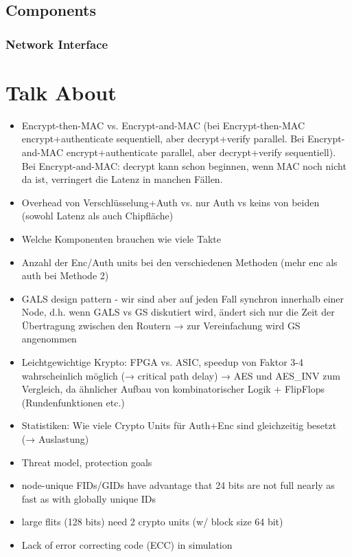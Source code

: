 \documentclass[
	paper=a4,
	fontsize=11pt,
	parskip=full %
]{scrreprt}
\begin{document}
    \section{Components}
    \subsection{Network Interface}

    \chapter{Talk About}
    \begin{itemize}
        \item Encrypt-then-MAC vs. Encrypt-and-MAC (bei Encrypt-then-MAC encrypt+authenticate sequentiell, aber decrypt+verify parallel.
            Bei Encrypt-and-MAC encrypt+authenticate parallel, aber decrypt+verify sequentiell). Bei Encrypt-and-MAC: decrypt kann schon
            beginnen, wenn MAC noch nicht da ist, verringert die Latenz in manchen Fällen.
        \item Overhead von Verschlüsselung+Auth vs. nur Auth vs keins von beiden (sowohl Latenz als auch Chipfläche)
        \item Welche Komponenten brauchen wie viele Takte
        \item Anzahl der Enc/Auth units bei den verschiedenen Methoden (mehr enc als auth bei Methode 2)
        \item GALS design pattern - wir sind aber auf jeden Fall synchron innerhalb einer Node, d.h. wenn GALS vs GS diskutiert wird,
            ändert sich nur die Zeit der Übertragung zwischen den Routern → zur Vereinfachung wird GS angenommen
        \item Leichtgewichtige Krypto: FPGA vs. ASIC, speedup von Faktor 3-4 wahrscheinlich möglich (→ critical path delay) \cite{kuon07fpgavsasic}
            → AES und AES\_INV zum Vergleich, da ähnlicher Aufbau von kombinatorischer Logik + FlipFlops (Rundenfunktionen etc.)
        \item Statistiken: Wie viele Crypto Units für Auth+Enc sind gleichzeitig besetzt (→ Auslastung)
        \item Threat model, protection goals
        \item node-unique FIDs/GIDs have advantage that 24 bits are not full nearly as fast as with globally unique IDs
		\item large flits (128 bits) need 2 crypto units (w/ block size 64 bit)
        \item Lack of error correcting code (ECC) in simulation
    \end{itemize}
\end{document}
